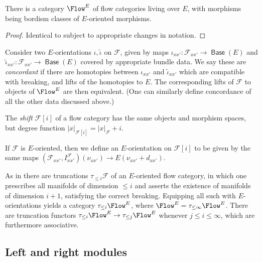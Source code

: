 \documentclass{TPmod}
\DeclareMathOperator{\Base}{\mathsf{Base}}
\newcommand{\cF}{\mathcal{F}}
\numberwithin{equation}{section}
\begin{document}
\begin{lem}
    There is a category $\Flow^E$ of flow categories living over $E$, with morphisms being bordism classes of $E$-oriented morphisms.
\end{lem}

\begin{proof}
    Identical to \cite[Section 5.2]{PS2} subject to appropriate changes in notation.
\end{proof}

\begin{ex} \label{ex:concordance of Flow orientations}
    Consider two $E$-orientations $\iota, \tilde{\iota}$ on $\cF$, given by maps $\iota_{xx'}: \cF_{xx'} \to \Base(E)$ and $\tilde{\iota}_{xx'}: \cF_{xx'} \to \Base(E)$ covered by appropriate bundle data. We say these are \emph{concordant} if there are homotopies between $\iota_{xx'}$ and $\tilde{\iota}_{xx'}$ which are compatible with breaking, and lifts of the homotopies to $E$. The corresponding lifts of $\cF$ to objects of $\Flow^E$ are then equivalent.  (One can similarly define concordance of all the other data discussed above.)
\end{ex}
    

  \begin{defn}
      The \emph{shift} $\cF[i]$ of a flow category has the same objects and morphism spaces, but degree function $|x|_{\cF[i]} = |x|_{\cF}+i$.  

If $\cF$ is $E$-oriented, then we define an $E$-orientation on $\cF[i]$ to be given by the same maps $(\cF_{xx'}, I^\cF_{xx'})(\nu_{xx'}) \to E(\nu_{xx'}+d_{xx'})$. 

  \end{defn}

  
  
  As in \cite{PS,PS2} there are truncations $\tau_{\leq i}\cF$ of an $E$-oriented flow category, in which one prescribes all manifolds of dimension $\leq i$ and asserts the existence of manifolds of dimension $i+1$, satisfying the correct breaking. Equipping all such with $E$-orientations yields a category  $\tau_{\leq i}\Flow^E$, where $\Flow^E = \tau_{\leq \infty}\Flow^E$.  There are  truncation functors $\tau_{\leq i}\Flow^E \to \tau_{\leq j}\Flow^E$ whenever $j \leq i \leq \infty$, which are furthermore associative. 


\subsection{Left and right modules}
\end{document}
